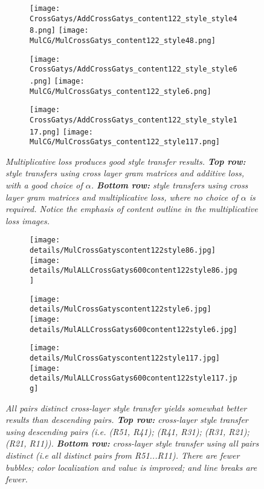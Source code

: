 \begin{figure}[!htbp]
    \centering
    \small 
    \begin{subfigure}[t]{0.3\linewidth}
        \texttt{[image: CrossGatys/AddCrossGatys\_content122\_style\_style48.png]}
        \texttt{[image: MulCG/MulCrossGatys\_content122\_style48.png]}
    \end{subfigure}
    \begin{subfigure}[t]{0.3\linewidth}
        \texttt{[image: CrossGatys/AddCrossGatys\_content122\_style\_style6.png]}
        \texttt{[image: MulCG/MulCrossGatys\_content122\_style6.png]}
    \end{subfigure}
    \begin{subfigure}[t]{0.3\linewidth}
        \texttt{[image: CrossGatys/AddCrossGatys\_content122\_style\_style117.png]} 
        \texttt{[image: MulCG/MulCrossGatys\_content122\_style117.png]}
    \end{subfigure}
    
    \caption{\em 
     Multiplicative loss produces good style transfer results.
    {\bf Top row:} style transfers using cross layer gram matrices and additive loss, with a good choice of $\alpha$. {\bf
      Bottom row:} style transfers using cross layer gram matrices and multiplicative loss, where no choice of $\alpha$ is required. Notice the emphasis of  content outline in the multiplicative loss images. 
    }
      \label{fig:MulCG}
    \end{figure}

\begin{figure}[!htbp]
    \centering
    \small 
    \begin{subfigure}[t]{0.3\linewidth}
        \texttt{[image: details/MulCrossGatyscontent122style86.jpg]}
        \texttt{[image: details/MulALLCrossGatys600content122style86.jpg]}
    \end{subfigure}
    \begin{subfigure}[t]{0.3\linewidth}
        \texttt{[image: details/MulCrossGatyscontent122style6.jpg]}
        \texttt{[image: details/MulALLCrossGatys600content122style6.jpg]}
    \end{subfigure}
    \begin{subfigure}[t]{0.3\linewidth}
        \texttt{[image: details/MulCrossGatyscontent122style117.jpg]}
        \texttt{[image: details/MulALLCrossGatys600content122style117.jpg]}
    \end{subfigure}
    \caption{\em All pairs distinct cross-layer style transfer yields somewhat better results than descending pairs.  {\bf
        Top row:} cross-layer style transfer using descending pairs (i.e. (R51, R41); (R41, R31); (R31, R21); (R21, R11)).
      {\bf Bottom row:}  cross-layer style transfer using all pairs distinct (i.e  all distinct pairs from R51...R11).
    There are fewer bubbles; color localization and value is improved; and line breaks are fewer.
      \label{fig:CGALL}}
    \end{figure}

